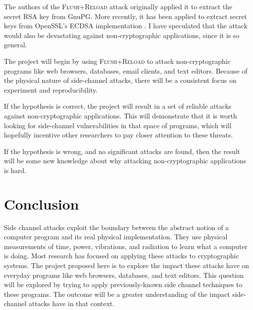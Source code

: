 \documentclass{acm_proc_article-sp}
\begin{document}
The authors of the \textsc{Flush+Reload} attack originally applied it to extract
the secret RSA key from GnuPG. More recently, it has been applied to extract
secret keys from OpenSSL's ECDSA implementation \cite{yarom2014recovering}.
I have speculated \cite{hornby2013flush} that the attack would also be
devastating against non-cryptographic applications, since it is so general.

The project will begin by using \textsc{Flush+Reload} to attack
non-cryptographic programs like web browsers, databases, email clients, and text
editors. Because of the physical nature of side-channel attacks, there will be
a consistent focus on experiment and reproducibility.

If the hypothesis is correct, the project will result in a set of reliable
attacks against non-cryptographic applications. This will demonstrate that it is
worth looking for side-channel vulnerabilities in that space of programs, which
will hopefully incentive other researchers to pay closer attention to these
threats.

If the hypothesis is wrong, and no significant attacks are found, then the
result will be some new knowledge about why attacking non-cryptographic
applications is hard.

\section{Conclusion}
\label{sec:conclusion}

Side channel attacks exploit the boundary between the abstract notion of
a computer program and its real physical implementation. They use physical
measurements of time, power, vibrations, and radiation to learn what a computer
is doing. Most research has focused on applying these attacks to cryptographic
systems. The project proposed here is to explore the impact these attacks have
on everyday programs like web browsers, databases, and text editors. This
question will be explored by trying to apply previously-known side channel
techniques to these programs. The outcome will be a greater understanding of the
impact side-channel attacks have in that context.



\end{document}
